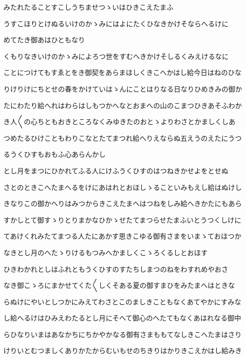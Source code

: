 \documentclass[a4paper,11pt,landscape]{ltjtarticle}
\begin{document}
\par\medskip
みたれたることすこしうちませつゝいはひきこえたまふ
\par\medskip
うすこほりとけぬるいけのかゝみにはよにたくひなきかけそならへるけに
\par\medskip
めてたき御あはひともなり
\par\medskip
くもりなきいけのかゝみによろつ世をすむへきかけそしるくみえけるなに
\par\medskip
ことにつけてもすゑとをき御契をあらまほしくきこへかはし給今日はねのひな
\par\medskip
りけりけにちとせの春をかけていはゝんにことはりなる日なりひめきみの御か
\par\medskip
たにわたり給へれはわらはしもつかへなとおまへの山のこまつひきあそふわか
\par\medskip
き人〱の心ちともおきところなくみゆきたのおとゝよりわさとかましくしあ
\par\medskip
つめたるひけこともわりこなとたてまつれ給へりえならぬ五えうのえたにうつ
\par\medskip
るうくひすもおもふ心あらんかし
\par\medskip
とし月をまつにひかれてふる人にけふうくひすのはつねきかせよをとせぬ
\par\medskip
さとのときこへたまへるをけにあはれとおほしゝることいみもえし給はぬけし
\par\medskip
きなりこの御かへりはみつからきこえたまへはつねをしみ給へきかたにもあら
\par\medskip
すかしとて御すゝりとりまかなひかゝせたてまつらせたまふいとうつくしけに
\par\medskip
てあけくれみたてまつる人たにあかす思きこゆる御有さまをいまゝておほつか
\par\medskip
なきとし月のへたゝりけるもつみへかましくこゝろくるしとおほす
\par\medskip
ひきわかれとしはふれともうくひすのすたちしまつのねをわすれめやおさ
\par\medskip
なき御こゝろにまかせてくた〱しくそある夏の御すまひをみたまへはときな
\par\medskip
らぬけにやいとしつかにみえてわさとこのましきこともなくあてやかにすみな
\par\medskip
し給へるけはひみえわたるとし月にそへて御心のへたてもなくあはれなる御中
\par\medskip
らひなりいまはあなかちにちかやかなる御有さまももてなしきこへたまはさり
\par\medskip
けりいとむつましくありかたからむいもせのちきりはかりきこえかはし給みき
\par\medskip
\end{document}
